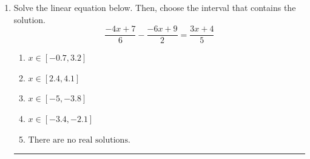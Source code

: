 \documentclass[14pt]{extbook}
\newcommand{\litem}[1]{\item#1\hspace*{-1cm}\rule{\textwidth}{0.4pt}}
\begin{document}
\begin{enumerate}
{\begin{enumerate}[label=\Alph*.]
\end{enumerate} }
\litem{
Solve the linear equation below. Then, choose the interval that contains the solution.\[ \frac{-4x + 7}{6} - \frac{-6x + 9}{2} = \frac{3x + 4}{5} \]\begin{enumerate}[label=\Alph*.]
\item \( x \in [-0.7, 3.2] \)
\item \( x \in [2.4, 4.1] \)
\item \( x \in [-5, -3.8] \)
\item \( x \in [-3.4, -2.1] \)
\item \( \text{There are no real solutions.} \)

\end{enumerate} }
\end{enumerate}
\end{document}
